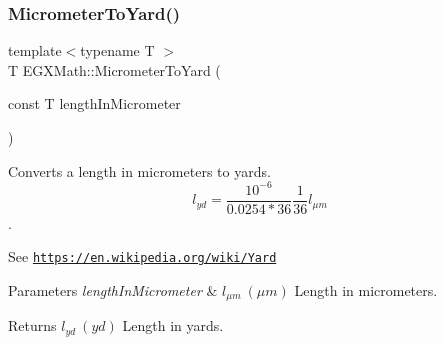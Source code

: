 \subsubsection{\texorpdfstring{Micrometer\+To\+Yard()}{MicrometerToYard()}}
{\footnotesize\ttfamily template$<$typename T $>$ \\
T E\+G\+X\+Math\+::\+Micrometer\+To\+Yard (\begin{DoxyParamCaption}\item[{const T}]{length\+In\+Micrometer }\end{DoxyParamCaption})}



Converts a length in micrometers to yards. \[ l_{yd}= \frac{10^{-6}}{0.0254 * 36} \frac{1}{36} l_{\mu m} \]. 

See \href{https://en.wikipedia.org/wiki/Yard}{\tt https\+://en.\+wikipedia.\+org/wiki/\+Yard} 
\begin{DoxyParams}{Parameters}
{\em length\+In\+Micrometer} & $ l_{\mu m}\ (\mu m)$ Length in micrometers. \\
\hline
\end{DoxyParams}
\begin{DoxyReturn}{Returns}
$ l_{yd}\ (yd)$ Length in yards. 
\end{DoxyReturn}

